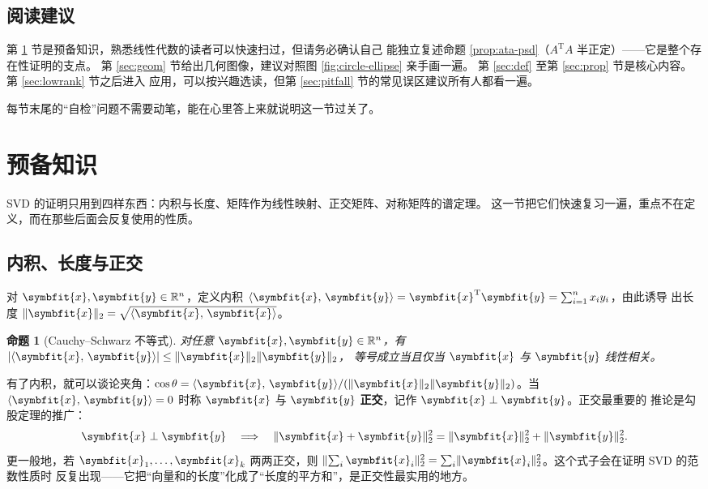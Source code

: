 \documentclass[UTF8, 11pt, a4paper, fontset=windows]{ctexart}
\theoremstyle{cnthm}
\newtheorem{prop}[thm]{命题}
\theoremstyle{cndef}
\newcommand{\T}{^{\mathrm{T}}}
\newcommand{\R}{\mathbb{R}}
\newcommand{\nrm}[1]{\lVert #1 \rVert}
\newcommand{\abs}[1]{\lvert #1 \rvert}
\newcommand{\ip}[2]{\langle #1,\, #2\rangle}
\newcommand{\x}{\symbfit{x}}
\newcommand{\y}{\symbfit{y}}
\begin{document}
\subsection{阅读建议}

第 \ref{sec:prelim} 节是预备知识，熟悉线性代数的读者可以快速扫过，但请务必确认自己
能独立复述命题 \ref{prop:ata-psd}（$A\T A$ 半正定）——它是整个存在性证明的支点。
第 \ref{sec:geom} 节给出几何图像，建议对照图 \ref{fig:circle-ellipse} 亲手画一遍。
第 \ref{sec:def} 至第 \ref{sec:prop} 节是核心内容。第 \ref{sec:lowrank} 节之后进入
应用，可以按兴趣选读，但第 \ref{sec:pitfall} 节的常见误区建议所有人都看一遍。

每节末尾的“自检”问题不需要动笔，能在心里答上来就说明这一节过关了。

\section{预备知识}\label{sec:prelim}

SVD 的证明只用到四样东西：内积与长度、矩阵作为线性映射、正交矩阵、对称矩阵的谱定理。
这一节把它们快速复习一遍，重点不在定义，而在那些后面会反复使用的性质。

\subsection{内积、长度与正交}

对 $\x,\y\in\R^{n}$，定义内积 $\ip{\x}{\y}=\x\T\y=\sum_{i=1}^{n}x_i y_i$，由此诱导
出长度 $\nrm{\x}_2=\sqrt{\ip{\x}{\x}}$。

\begin{prop}[Cauchy--Schwarz 不等式]\label{prop:cs}
对任意 $\x,\y\in\R^{n}$，有 $\abs{\ip{\x}{\y}}\le\nrm{\x}_2\nrm{\y}_2$，
等号成立当且仅当 $\x$ 与 $\y$ 线性相关。
\end{prop}

有了内积，就可以谈论夹角：$\cos\theta=\ip{\x}{\y}/(\nrm{\x}_2\nrm{\y}_2)$。当
$\ip{\x}{\y}=0$ 时称 $\x$ 与 $\y$ \textbf{正交}，记作 $\x\perp\y$。正交最重要的
推论是勾股定理的推广：
\begin{equation}
  \x\perp\y \quad\Longrightarrow\quad \nrm{\x+\y}_2^2=\nrm{\x}_2^2+\nrm{\y}_2^2 .
\end{equation}
更一般地，若 $\x_1,\dots,\x_k$ 两两正交，则
$\nrm{\sum_{i}\x_i}_2^2=\sum_i\nrm{\x_i}_2^2$。这个式子会在证明 SVD 的范数性质时
反复出现——它把“向量和的长度”化成了“长度的平方和”，是正交性最实用的地方。
\end{document}
